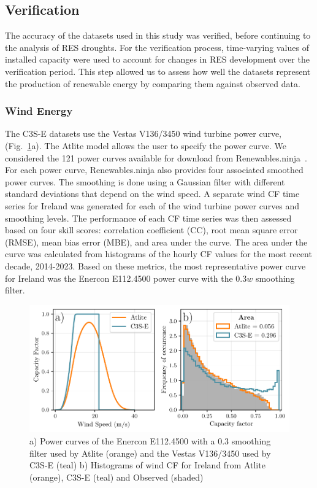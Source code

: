 \documentclass[preprint, 12pt, authoryear]{elsarticle}
\begin{document}
\subsection{Verification}
\label{sec:verification}

The accuracy of the datasets used in this study was verified, before continuing to the analysis of RES droughts. For the verification process, time-varying values of installed capacity were used to account for changes in RES development over the verification period. This step allowed us to assess how well the datasets represent the production of renewable energy by comparing them against observed data.

\subsubsection{Wind Energy}
\label{sec:wind_verification}

The C3S-E datasets use the Vestas V136/3450 wind turbine power curve, (Fig.~\ref{fig:power_curve}a). The Atlite model allows the user to specify the power curve. We considered the 121 power curves available for download from Renewables.ninja~\citep{staffell2016wake}. For each power curve, Renewables.ninja also provides four associated smoothed power curves. The smoothing is done using a Gaussian filter with different standard deviations that depend on the wind speed. A separate wind CF time series for Ireland was generated for each of the wind turbine power curves and smoothing levels. The performance of each CF time series was then assessed based on four skill scores: correlation coefficient (CC), root mean square error (RMSE), mean bias error (MBE), and area under the curve. The area under the curve was calculated from histograms of the hourly CF values for the most recent decade, 2014-2023. Based on these metrics, the most representative power curve for Ireland was the Enercon E112.4500 power curve with the $0.3w$  smoothing filter.

\begin{figure}[!ht]
	\centering
	\includegraphics[width=\textwidth]{verification_power_curve.pdf}
	\caption{a) Power curves of the Enercon E112.4500 with a 0.3 smoothing filter used by Atlite (orange) and the Vestas V136/3450 used by C3S-E (teal) b) Histograms of wind CF for Ireland from Atlite (orange), C3S-E (teal) and Observed (shaded)}
	\label{fig:power_curve}
\end{figure}
\end{document}
